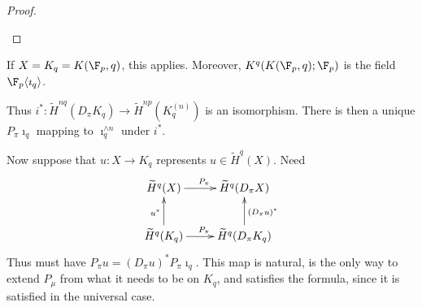 \documentclass[11pt]{article}
\begin{document}
\begin{SteenrodTalk}
\begin{proof}
\begin{itemize}
\end{itemize}
\end{proof}
\begin{itemise}
\item If $X=K_q=K(\F_p,q)$, this applies. Moreover, $K^q(K(\F_p,q);\F_p)$ is the field $\F_p\langle\imath_q\rangle$.
\item Thus $i^*:\widetilde H^{nq}(D_\pi K_q)\to \widetilde H^{np}(K_q^{(n)})$ is an isomorphism. There is then a unique $P_\pi\imath_q$ mapping to $\imath_q^{\wedge n}$ under $i^*$.
\item Now suppose that $u:X\to K_q$ represents $u\in \widetilde H^q(X)$. Need
\[\xymatrix{
\widetilde H^q(X)\ar[r]^{P_\pi}&\widetilde H^q(D_\pi X)\\
\widetilde H^q(K_q)\ar[r]^{P_\pi} \ar[u]^{u^*}&\widetilde H^q(D_\pi K_q)\ar[u]_{(D_\pi u)^*}
}\]
Thus must have $P_\pi u=(D_\pi u)^*P_\pi\imath_q$. This map is natural, is the only way to extend $P_\mu$ from what it needs to be on $K_q$, and satisfies the formula, since it is satisfied in the universal case.
\end{itemise}

\pagebreak


\end{SteenrodTalk}
\end{document}
